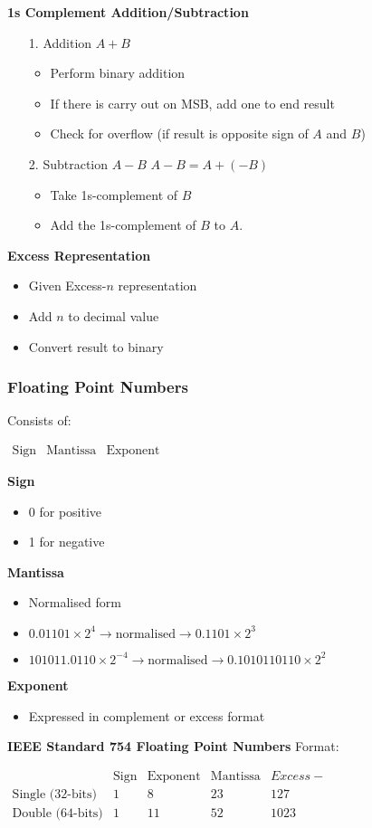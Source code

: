 \documentclass[10pt, twocolumn]{article}
\begin{document}
{\bf 1s Complement Addition/Subtraction}
\begin{enumerate}
\item[1.]{Addition $A+B$}
\begin{itemize}
\item Perform binary addition
\item If there is carry out on MSB, add one to end result
\item Check for overflow (if result is opposite sign of $A$ and $B$)
\end{itemize}
\item[2.]{Subtraction $A-B$}
\newline
$A-B = A+(-B)$
\begin{itemize}
\item Take 1s-complement of $B$
\item Add the 1s-complement of $B$ to $A$.
\end{itemize}
\end{enumerate}
{\bf Excess Representation}
\begin{itemize}
\item Given Excess-$n$ representation
\item Add $n$ to decimal value
\item Convert result to binary
\end{itemize}

\subsubsection{Floating Point Numbers}
Consists of:
\begin{center}
$\begin{array}{|c|c|c|}
\text{Sign} & \text{Mantissa} & \text{Exponent}
\end{array}$
\end{center}
{\bf Sign}
\begin{itemize}
\item 0 for positive
\item 1 for negative
\end{itemize}
{\bf Mantissa}
\begin{itemize}
\item Normalised form
\item $0.01101 \times 2^4 \rightarrow \text{normalised} \rightarrow 0.1101 \times 2^3$
\item $101011.0110 \times 2^{-4} \rightarrow \text{normalised} \rightarrow 0.1010110110 \times 2^2$
\end{itemize}
{\bf Exponent}
\begin{itemize}
\item Expressed in complement or excess format
\end{itemize}
{\bf IEEE Standard 754 Floating Point Numbers}
Format:
\begin{center}
$\begin{array}{c|c|c|c|c}
& \text{Sign} & \text{Exponent} & \text{Mantissa} & Excess-  \\ \hline
\text{Single (32-bits)} & 1 & 8 & 23 & 127 \\ \hline
\text{Double (64-bits)} & 1 & 11 & 52 & 1023
\end{array}$
\end{center}
\end{document}
